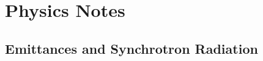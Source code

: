 \documentclass{book}
\begin{document}
\part{Physics Notes}
\chapter{Emittances and Synchrotron Radiation}


\begin{theindex}
\end{theindex}
\end{document}
